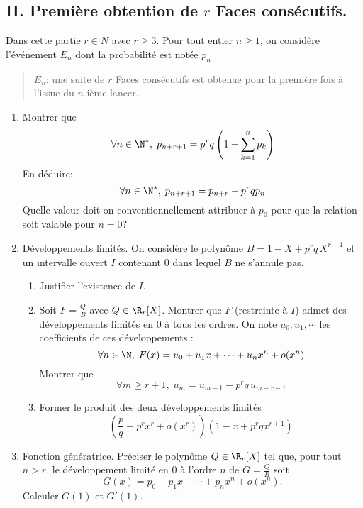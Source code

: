 \subsection*{II. Première obtention de $r$ Faces consécutifs.}
Dans cette partie $r \in N$ avec $r \geq 3$. Pour tout entier $n\geq 1$, on considère l'événement $E_n$ dont la probabilité est notée $p_n$
\begin{quote}
 $E_n$: \og une suite de $r$ Faces consécutifs est obtenue pour la première fois à l'issue du $n$-ième lancer.\fg
\end{quote}
\begin{enumerate}
 \item Montrer que 
\begin{displaymath}
\forall n \in \N^*, \;  p_{n+r+1} = p^r q \left( 1 - \sum_{k=1}^{n}p_k\right) 
\end{displaymath}
En déduire:
\begin{displaymath}
 \forall n\in \N^*, \; p_{n+r+1} = p_{n+r} - p^r q p_n
\end{displaymath}
Quelle valeur doit-on conventionnellement attribuer à $p_0$ pour que la relation soit valable pour $n=0$?

\item Développements limités.\newline
On considère le polynôme $B = 1-X+p^rq\,X^{r+1}$ et un intervalle ouvert $I$ contenant $0$ dans lequel $B$ ne s'annule pas. 
\begin{enumerate}
 \item Justifier l'existence de $I$.
 \item Soit $F=\frac{Q}{B}$ avec $Q\in \R_{r
 }[X]$. Montrer que $F$ (restreinte à $I$) admet des développements limités en $0$ à tous les ordres. On note $u_0, u_1, \cdots$ les coefficients de ces développements :
\begin{displaymath}
\forall n \in \N, \; F(x) = u_0 + u_1x + \cdots + u_n x^n + o(x^n)
\end{displaymath}
Montrer que
\begin{displaymath}
\forall m \geq r+1, \; u_m = u_{m-1} - p^rq\, u_{m-r-1} 
\end{displaymath}
\item Former le produit des deux développements limités
\begin{displaymath}
 \left( \frac{p}{q} +p^r x^r + o(x^r)\right)\left( 1 - x +p^rq x^{r+1}\right)  
\end{displaymath}
\end{enumerate}

\item Fonction génératrice.\newline
Préciser le polynôme $Q\in \R_r[X]$ tel que, pour tout $n>r$, le développement limité en $0$ à l'ordre $n$ de $G=\frac{Q}{B}$ soit 
\begin{displaymath}
 G(x) = p_0 + p_1x + \cdots + p_nx^n + o(x^n).
\end{displaymath}
Calculer $G(1)$ et $G'(1)$.
\end{enumerate}

